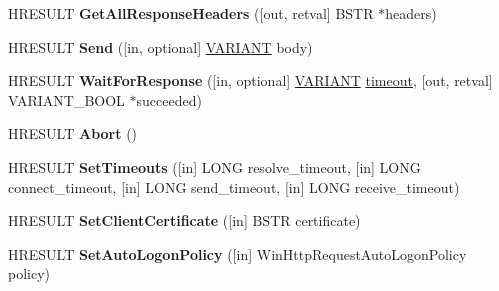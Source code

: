 \begin{DoxyCompactItemize}
H\+R\+E\+S\+U\+LT {\bfseries Get\+All\+Response\+Headers} (\mbox{[}out, retval\mbox{]} B\+S\+TR $\ast$headers)
\item 
\mbox{\label{interface_win_http_1_1_i_win_http_request_abd87ba354c07db1b70c87fd60d99d4a8}} 
H\+R\+E\+S\+U\+LT {\bfseries Send} (\mbox{[}in, optional\mbox{]} \hyperlink{structtag_v_a_r_i_a_n_t}{V\+A\+R\+I\+A\+NT} body)
\item 
\mbox{\label{interface_win_http_1_1_i_win_http_request_af7c12342d2dd337433519166692ce528}} 
H\+R\+E\+S\+U\+LT {\bfseries Wait\+For\+Response} (\mbox{[}in, optional\mbox{]} \hyperlink{structtag_v_a_r_i_a_n_t}{V\+A\+R\+I\+A\+NT} \hyperlink{structtimeout}{timeout}, \mbox{[}out, retval\mbox{]} V\+A\+R\+I\+A\+N\+T\+\_\+\+B\+O\+OL $\ast$succeeded)
\item 
\mbox{\label{interface_win_http_1_1_i_win_http_request_a39729cfcc81f8f81a7a8e9d1eacbf785}} 
H\+R\+E\+S\+U\+LT {\bfseries Abort} ()
\item 
\mbox{\label{interface_win_http_1_1_i_win_http_request_a4bab998f731e80ac785efee79266083a}} 
H\+R\+E\+S\+U\+LT {\bfseries Set\+Timeouts} (\mbox{[}in\mbox{]} L\+O\+NG resolve\+\_\+timeout, \mbox{[}in\mbox{]} L\+O\+NG connect\+\_\+timeout, \mbox{[}in\mbox{]} L\+O\+NG send\+\_\+timeout, \mbox{[}in\mbox{]} L\+O\+NG receive\+\_\+timeout)
\item 
\mbox{\label{interface_win_http_1_1_i_win_http_request_a5adad6082ab92a4fcd97e18ad90b874c}} 
H\+R\+E\+S\+U\+LT {\bfseries Set\+Client\+Certificate} (\mbox{[}in\mbox{]} B\+S\+TR certificate)
\item 
\mbox{\label{interface_win_http_1_1_i_win_http_request_a82d2832f3ea6203d266f3c10ac2df89d}} 
H\+R\+E\+S\+U\+LT {\bfseries Set\+Auto\+Logon\+Policy} (\mbox{[}in\mbox{]} Win\+Http\+Request\+Auto\+Logon\+Policy policy)
\end{DoxyCompactItemize}
